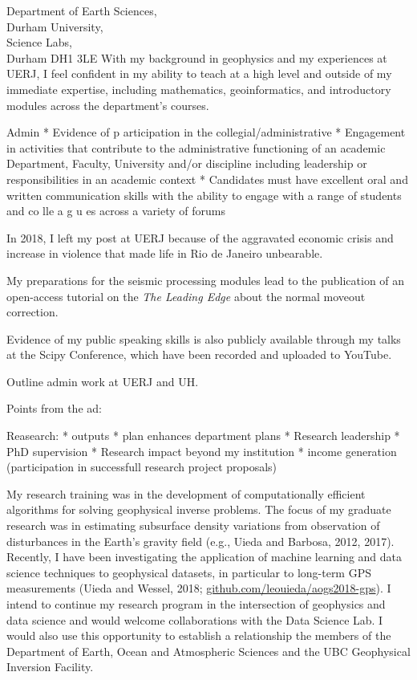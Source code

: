 \documentclass[11pt]{letter}
\begin{document}
\begin{letter}{
        Department of Earth Sciences,  \\
        Durham University, \\
        Science Labs, \\
        Durham DH1 3LE
}
With my background in geophysics and my experiences at UERJ, I feel confident in my
ability to teach at a high level and outside of my immediate expertise, including
mathematics, geoinformatics, and introductory modules across the department's courses.


Admin
* Evidence of p articipation in the collegial/administrative
* Engagement in activities that contribute to the administrative functioning of an academic Department, Faculty, University and/or discipline including leadership or responsibilities in an academic context
* Candidates must have excellent oral and written communication skills with the ability to engage with a range of students and co lle a g u es across a variety of forums

In 2018, I left my post at UERJ because of the aggravated economic crisis and increase
in violence that made life in Rio de Janeiro unbearable.

My preparations for the seismic processing modules lead to the publication of an
open-access tutorial on the \textit{The Leading Edge} about the normal moveout
correction.


Evidence of my public speaking skills is also publicly available through my
talks at the Scipy Conference, which have been recorded and uploaded to YouTube.




Outline admin work at UERJ and UH.


Points from the ad:

Reasearch:
* outputs
* plan enhances department plans
* Research leadership
* PhD supervision
* Research impact beyond my institution
* income generation (participation in successfull research project proposals)







My research training was in the development of computationally efficient
algorithms for solving geophysical inverse problems.
The focus of my graduate research was in estimating subsurface density
variations from observation of disturbances in the Earth's gravity field (e.g.,
Uieda and Barbosa, 2012, 2017).
Recently, I have been investigating the application of machine learning and
data science techniques to geophysical datasets,
in particular to long-term GPS measurements
(Uieda and Wessel, 2018;
\href{https://github.com/leouieda/aogs2018-gps}{github.com/leouieda/aogs2018-gps}).
I intend to continue my research program in the intersection of geophysics and
data science and would welcome collaborations with the Data Science Lab.
I would also use this opportunity to establish a relationship the members of
the Department of Earth, Ocean and Atmospheric Sciences and the
UBC Geophysical Inversion Facility.


\end{letter}
\end{document}
